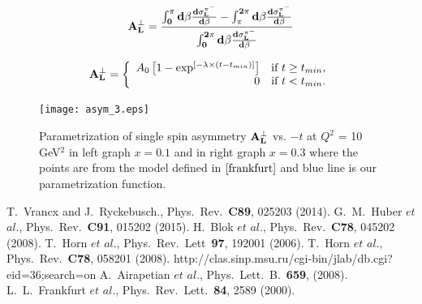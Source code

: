 \documentclass{article}
\begin{document}
\begin{equation}
  \bf{A_{L}^{\perp}} = \frac{\int^{\pi}_{0}d\beta\frac{d\sigma_{L}^{\pi^{-}}}{d\beta} - \int^{2\pi}_{\pi}d\beta\frac{d\sigma_{L}^{\pi^{-}}}{d\beta} } 
       {\int^{2\pi}_{0}d\beta\frac{d\sigma_{L}^{\pi^{-}}}{d\beta}}         
     \label{equation:ssa}
\end{equation}

\begin{equation}
        \bf{A_{L}^{\perp}} = \left\{
        \begin{array}{rl}
        A_{0} \left[ 1 - \exp^{ [ -\lambda \times ( t - t_{min} ) ] } \right] & \text{if } t \ge t_{min}, \\
        0 &  \text{if } t < t_{min}.
        \end{array} \right.
     \label{equation:asy-fit}
\end{equation}


\begin{figure}[!hbt]
    \centering
    \texttt{[image: asym\_3.eps]}
    \caption{ Parametrization of single spin asymmetry $\bf{A_{L}^{\perp}}$ vs. $-t$ at $Q^2$ = 10 GeV$^2$ in 
    left graph $x = 0.1$ and in right  graph $x = 0.3$ where the points are from the model defined in $\cite{frankfurt}$ 
    and blue line is our parametrization function.}
    \label{fig:asym-1}
\end{figure}

\newpage
        
\begin{thebibliography}{60}
	        T.~Vrancx and J.~Ryckebusch., Phys.~Rev.~\textbf{C89}, 025203 (2014).
	G.~M.~Huber $\textit{et}$ $\textit{al}$., Phys.~Rev.~\textbf{C91}, 015202 (2015).
	H.~Blok $\textit{et}$ $\textit{al}$., Phys.~Rev.~\textbf{C78}, 045202 (2008).
	T.~Horn $\textit{et}$ $\textit{al}$., Phys.~Rev.~Lett~\textbf{97}, 192001 (2006).
	T.~Horn $\textit{et}$ $\textit{al}$., Phys.~Rev.~\textbf{C78}, 058201 (2008).
	        http://clas.sinp.msu.ru/cgi-bin/jlab/db.cgi?eid=36;search=on
	A.~Airapetian $\textit{et}$ $\textit{al}$., Phys.~Lett.~B.~\textbf{659}, (2008).
	L.~L.~Frankfurt $\textit{et}$ $\textit{al}$., Phys.~Rev.~Lett.~\textbf{84}, 2589 (2000).

\end{thebibliography}
\end{document}
